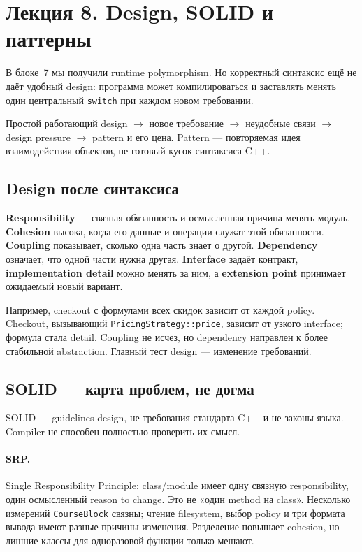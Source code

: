 \section{Лекция 8. Design, SOLID и паттерны}
\label{sec:lecture-08}

В блоке~7 мы получили runtime polymorphism. Но корректный синтаксис ещё не
даёт удобный design: программа может компилироваться и заставлять менять один
центральный \texttt{switch} при каждом новом требовании.

\begin{importantbox}
Простой работающий design $\rightarrow$ новое требование $\rightarrow$
неудобные связи $\rightarrow$ design pressure $\rightarrow$ pattern и его
цена. Pattern --- повторяемая идея взаимодействия объектов, не готовый кусок
синтаксиса C++.
\end{importantbox}

\subsection{Design после синтаксиса}

\textbf{Responsibility} --- связная обязанность и осмысленная причина менять
модуль. \textbf{Cohesion} высока, когда его данные и операции служат этой
обязанности. \textbf{Coupling} показывает, сколько одна часть знает о другой.
\textbf{Dependency} означает, что одной части нужна другая. \textbf{Interface}
задаёт контракт, \textbf{implementation detail} можно менять за ним, а
\textbf{extension point} принимает ожидаемый новый вариант.

Например, checkout с формулами всех скидок зависит от каждой policy. Checkout,
вызывающий \texttt{PricingStrategy::price}, зависит от узкого interface;
формула стала detail. Coupling не исчез, но dependency направлен к более
стабильной abstraction. Главный тест design --- изменение требований.

\subsection{SOLID --- карта проблем, не догма}

SOLID --- guidelines design, не требования стандарта C++ и не законы языка.
Compiler не способен полностью проверить их смысл.

\paragraph{SRP.} Single Responsibility Principle: class/module имеет одну
связную responsibility, один осмысленный reason to change. Это не «один method
на class». Несколько измерений \texttt{CourseBlock} связны; чтение filesystem,
выбор policy и три формата вывода имеют разные причины изменения. Разделение
повышает cohesion, но лишние классы для одноразовой функции только мешают.

